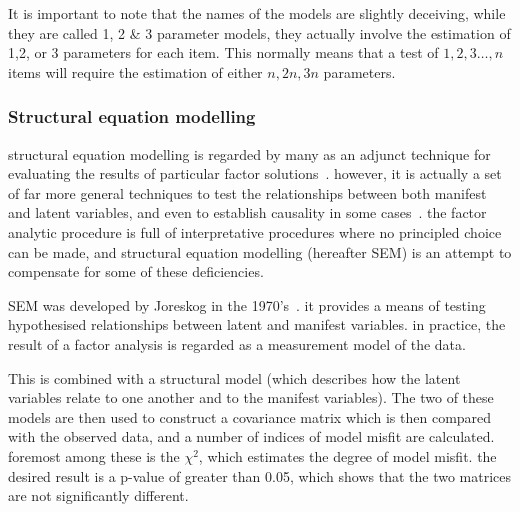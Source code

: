 
It is important to note that the names of the models are slightly deceiving, while they are called 1, 2 \& 3 parameter models, they actually involve the estimation of 1,2, or 3 parameters for each item. This normally means that a test of ${1,2,3\ldots, n}$ items will require the estimation of either ${n, 2n, 3n}$ parameters. %


\subsubsection{Structural equation modelling}
\label{sec:struct-equat-model}

structural equation modelling is regarded by many as an adjunct technique for evaluating the results of particular factor solutions~\cite{fabrigar1999evaluating}. however, it is actually a set of far more general techniques to test the relationships between both manifest and latent variables, and even to establish causality in some cases~\cite{pearl1998graphs}. the factor analytic procedure is full of interpretative procedures where no principled choice can be made, and structural equation modelling (hereafter SEM) is an attempt to compensate for some of these deficiencies.

SEM was developed by Joreskog in the 1970's~\cite{joreskog1978structural}. it provides a means of testing hypothesised relationships between latent and manifest variables. in practice, the result of a factor analysis is regarded as a measurement model of the data.

This is combined with a structural model (which describes how the latent variables relate to one another and to the manifest variables). The two of these models are then used to construct a covariance matrix which is then compared with the observed data, and a number of indices of model misfit are calculated. foremost among these is the $\chi^2$, which estimates the degree of model misfit. the desired result is a p-value of greater than 0.05, which shows that the two matrices are not significantly different.

